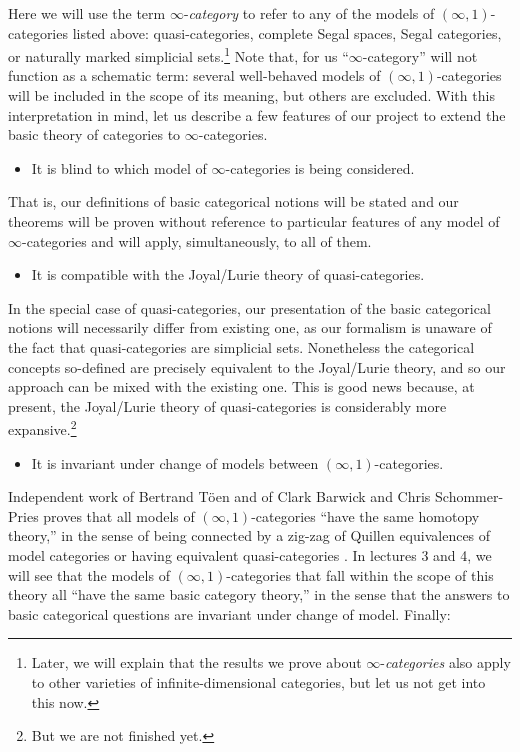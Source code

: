 \documentclass[12pt,reqno]{amsart}
\theoremstyle{plain}
\theoremstyle{definition}
\theoremstyle{remark}
\numberwithin{equation}{subsection}
\begin{document}
Here we will use the term $\infty$-\emph{category} to refer to any of the models of $(\infty,1)$-categories listed above: quasi-categories, complete Segal spaces, Segal categories, or naturally marked simplicial sets.\footnote{Later, we will explain that the results we prove about $\infty$-\emph{categories} also apply to  other varieties of infinite-dimensional categories, but let us not get into this now.} Note that, for us ``$\infty$-category'' will not function as a schematic term: several well-behaved models of $(\infty,1)$-categories will be included in the scope of its meaning, but others are excluded.  With this interpretation in mind, let us describe a few features of our project to extend the basic theory of categories to $\infty$-categories.
\begin{itemize}
\item It is blind to which model of $\infty$-categories is being considered.
\end{itemize}
That is, our definitions of basic categorical notions will be stated and our theorems will be proven without reference to particular features of any model of $\infty$-categories and will apply, simultaneously, to all of them. 
\begin{itemize}
\item It is compatible with the Joyal/Lurie theory of quasi-categories.
\end{itemize}
In the special case of quasi-categories, our presentation of the basic categorical notions will necessarily differ from existing one, as our formalism is unaware of the fact that quasi-categories are simplicial sets. Nonetheless the categorical concepts so-defined are precisely equivalent to the Joyal/Lurie theory, and so our approach can be mixed with the existing one. This is good news because, at present, the Joyal/Lurie theory of quasi-categories is considerably more expansive.\footnote{But we are not finished yet.}
\begin{itemize}
\item It is invariant under change of models between $(\infty,1)$-categories.%
\end{itemize}
Independent work of Bertrand T\"{o}en and of Clark Barwick and Chris Schommer-Pries proves that all models of $(\infty,1)$-categories ``have the same homotopy theory,'' in the sense of being connected by a zig-zag of Quillen equivalences of model categories  \cite{Toen:2005vu}  or having equivalent quasi-categories  \cite{BSP:2011ot}. In lectures 3 and 4, we will see that the models of $(\infty,1)$-categories that fall within the scope of this theory all ``have the same basic category theory,'' in the sense that the answers to basic categorical questions are invariant under change of model. Finally:
\end{document}
